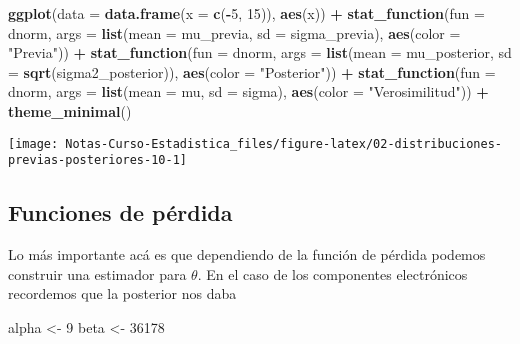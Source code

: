 \documentclass[
  12pt,
]{book}
\newenvironment{Shaded}{\begin{snugshade}}{\end{snugshade}}
\newcommand{\DataTypeTok}[1]{\textcolor[rgb]{0.13,0.29,0.53}{#1}}
\newcommand{\DecValTok}[1]{\textcolor[rgb]{0.00,0.00,0.81}{#1}}
\newcommand{\KeywordTok}[1]{\textcolor[rgb]{0.13,0.29,0.53}{\textbf{#1}}}
\newcommand{\NormalTok}[1]{#1}
\newcommand{\OperatorTok}[1]{\textcolor[rgb]{0.81,0.36,0.00}{\textbf{#1}}}
\newcommand{\StringTok}[1]{\textcolor[rgb]{0.31,0.60,0.02}{#1}}
\begin{document}
\begin{Shaded}
\begin{Highlighting}[]
\KeywordTok{ggplot}\NormalTok{(}\DataTypeTok{data =} \KeywordTok{data.frame}\NormalTok{(}\DataTypeTok{x =} \KeywordTok{c}\NormalTok{(}\OperatorTok{{-}}\DecValTok{5}\NormalTok{, }\DecValTok{15}\NormalTok{)), }\KeywordTok{aes}\NormalTok{(x)) }\OperatorTok{+}
\StringTok{  }\KeywordTok{stat\_function}\NormalTok{(}\DataTypeTok{fun =}\NormalTok{ dnorm, }\DataTypeTok{args =} \KeywordTok{list}\NormalTok{(}\DataTypeTok{mean =}\NormalTok{ mu\_previa, }\DataTypeTok{sd =}\NormalTok{ sigma\_previa), }\KeywordTok{aes}\NormalTok{(}\DataTypeTok{color =} \StringTok{"Previa"}\NormalTok{)) }\OperatorTok{+}
\StringTok{  }\KeywordTok{stat\_function}\NormalTok{(}\DataTypeTok{fun =}\NormalTok{ dnorm, }\DataTypeTok{args =} \KeywordTok{list}\NormalTok{(}\DataTypeTok{mean =}\NormalTok{ mu\_posterior, }\DataTypeTok{sd =} \KeywordTok{sqrt}\NormalTok{(sigma2\_posterior)), }\KeywordTok{aes}\NormalTok{(}\DataTypeTok{color =} \StringTok{"Posterior"}\NormalTok{)) }\OperatorTok{+}
\StringTok{  }\KeywordTok{stat\_function}\NormalTok{(}\DataTypeTok{fun =}\NormalTok{ dnorm, }\DataTypeTok{args =} \KeywordTok{list}\NormalTok{(}\DataTypeTok{mean =}\NormalTok{ mu, }\DataTypeTok{sd =}\NormalTok{ sigma), }\KeywordTok{aes}\NormalTok{(}\DataTypeTok{color =} \StringTok{"Verosimilitud"}\NormalTok{)) }\OperatorTok{+}
\StringTok{  }\KeywordTok{theme\_minimal}\NormalTok{()}
\end{Highlighting}
\end{Shaded}

\begin{center}\texttt{[image: Notas-Curso-Estadistica\_files/figure-latex/02-distribuciones-previas-posteriores-10-1]} \end{center}

\hypertarget{funciones-de-puxe9rdida-1}{%
\subsection{Funciones de pérdida}\label{funciones-de-puxe9rdida-1}}

Lo más importante acá es que dependiendo de la función de pérdida podemos construir una estimador para \(\theta\). En el caso de los componentes electrónicos recordemos que la posterior nos daba

\begin{Shaded}
\begin{Highlighting}[]
\NormalTok{alpha \textless{}{-}}\StringTok{ }\DecValTok{9}
\NormalTok{beta \textless{}{-}}\StringTok{ }\DecValTok{36178}
\end{Highlighting}
\end{Shaded}
\end{document}
